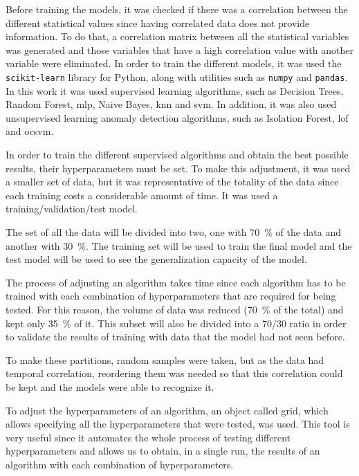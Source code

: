 Before training the models, it was checked if there was a correlation between the different statistical values since having correlated data does not provide information. To do that, a correlation matrix between all the statistical variables was generated and those variables that have a high correlation value with another variable were eliminated. In order to train the different models, it was used the \texttt{scikit-learn} library for Python, along with utilities such as \texttt{numpy} and \texttt{pandas}. In this work it was used supervised learning algorithms, such as Decision Trees, Random Forest, \acrfull{mlp}, Naive Bayes, \acrfull{knn} and \acrfull{svm}. In addition, it was also used unsupervised learning anomaly detection algorithms, such as Isolation Forest, \acrfull{lof} and \acrfull{ocsvm}.

In order to train the different supervised algorithms and obtain the best possible results, their hyperparameters must be set. To make this adjustment, it was used a smaller set of data, but it was representative of the totality of the data since each training costs a considerable amount of time. It was used a training/validation/test model.
 
 
The set of all the data will be divided into two, one with \SI{70}{\percent} of the data and another with \SI{30}{\percent}. The training set will be used to train the final model and the test model will be used to see the generalization capacity of the model.


The process of adjusting an algorithm takes time since each algorithm has to be trained with each combination of hyperparameters that are required for being tested. For this reason, the volume of data was reduced (\SI{70}{\percent} of the total) and kept only \SI{35}{\percent} of it. This subset will also be divided into a 70/30 ratio in order to validate the results of training with data that the model had not seen before.

To make these partitions, random samples were taken, but as the data had temporal correlation, reordering them was needed so that this correlation could be kept and the models were able to recognize it. 

To adjust the hyperparameters of an algorithm, an object called grid, which allows specifying all the hyperparameters that were tested, was used. This tool is very useful since it automates the whole process of testing different hyperparameters and allows us to obtain, in a single run, the results of an algorithm with each combination of hyperparameters.

